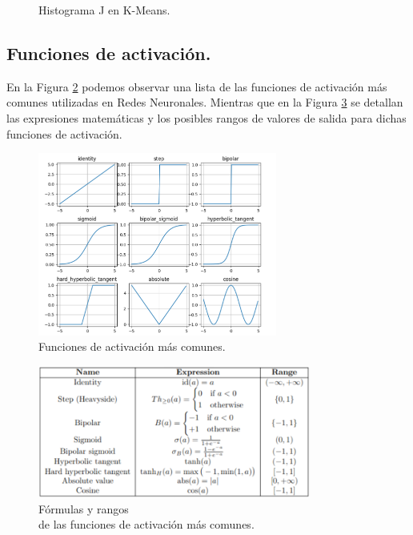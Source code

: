 \documentclass[12pt,a4paper]{article}
\begin{document}
\begin{sloppypar}
\begin{figure}[H]
\begin{minipage}[b]{0.5\linewidth}
\caption{Histograma J en K-Means. \cite{apunte_uba}}
\label{fig:K_means_costo_4}
\end{minipage}
\end{figure}

\cleardoublepage

\subsection{Funciones de activación.}\label{anexo_func_activ}

En la Figura \ref{fig:ann_7} podemos observar una lista de las funciones de activación más comunes utilizadas en Redes Neuronales. Mientras que en la Figura \ref{fig:ann_8} se detallan las expresiones matemáticas y los posibles rangos de valores de salida para dichas funciones de activación. 

\begin{figure}[H]    %
 \centering
 \includegraphics[width=0.7\textwidth]{images/ANN/7-ANN.png}
 \caption{Funciones de activación más comunes\cite{ANN_22}.} 
 \label{fig:ann_7}
\end{figure}

\begin{figure}[H]    %
 \centering
 \includegraphics[width=0.8\textwidth]{images/ANN/8-ANN.png}
 \caption[Fórmulas y rangos de las funciones de activación más comunes.]{Fórmulas y rangos\\ de las funciones de activación más comunes\protect\footnotemark \cite{ANN_22}.}
 \label{fig:ann_8}
\end{figure}


\end{sloppypar}
\end{document}
